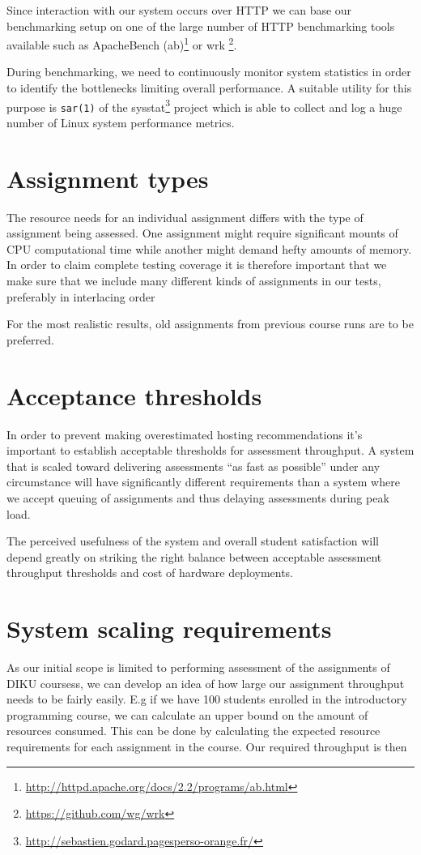Since interaction with our system occurs over HTTP we can base our
benchmarking setup on one of the large number of HTTP benchmarking
tools available such as ApacheBench
(ab)\footnote{\url{http://httpd.apache.org/docs/2.2/programs/ab.html}}
or wrk \footnote{\url{https://github.com/wg/wrk}}.

During benchmarking, we need to continuously monitor system statistics
in order to identify the bottlenecks limiting overall performance. A
suitable utility for this purpose is \texttt{sar(1)} of the
sysstat\footnote{\url{http://sebastien.godard.pagesperso-orange.fr/}}
project which is able to collect and log a huge number of Linux system
performance metrics.

\section{Assignment types}
The resource needs for an individual assignment differs with the type
of assignment being assessed. One assignment might require significant
mounts of CPU computational time while another might demand hefty
amounts of memory. In order to claim complete testing coverage it is
therefore important that we make sure that we include many different
kinds of assignments in our tests, preferably in interlacing order

For the most realistic results, old assignments from previous course
runs are to be preferred.

\section{Acceptance thresholds}
In order to prevent making overestimated hosting recommendations it's
important to establish acceptable thresholds for assessment
throughput. A system that is scaled toward delivering assessments "`as
fast as possible"' under any circumstance will have significantly
different requirements than a system where we accept queuing of
assignments and thus delaying assessments during peak load.

The perceived usefulness of the system and overall student
satisfaction will depend greatly on striking the right balance between
acceptable assessment throughput thresholds and cost of hardware
deployments.

\section{System scaling requirements}
As our initial scope is limited to performing assessment of
the assignments of DIKU coursess, we can develop an
idea of how large our assignment throughput needs to be fairly easily. E.g if we
have 100 students enrolled in the introductory programming course, we
can calculate an upper bound on the amount of resources
consumed. This can be done by calculating the expected resource
requirements for each assignment in the course. Our required
throughput is then 

